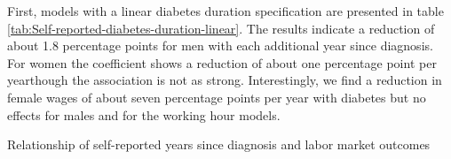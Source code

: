 \documentclass[12pt,english,british]{article}
\providecommand{\DIFaddtex}[1]{{\protect\color{blue}\uwave{#1}}} %
\providecommand{\DIFaddbegin}{} %
\providecommand{\DIFaddend}{} %
\providecommand{\DIFadd}[1]{\texorpdfstring{\DIFaddtex{#1}}{#1}} %
\begin{document}
First, models with a linear diabetes duration specification are presented
in table \ref{tab:Self-reported-diabetes-duration-linear}. The results
indicate a reduction of about 1.8 percentage points for men with each
additional year since diagnosis. For women the coefficient shows a
reduction of about one percentage point per year\DIFaddbegin \DIFadd{, }\DIFaddend though the association
is not as strong. Interestingly, we find a reduction in female wages of about seven percentage points per year with diabetes but no effects for males and for the working hour models.
\begin{table}[h]
\caption{\label{tab:Self-reported-diabetes-duration-linear}Relationship of self-reported years since diagnosis and labor market outcomes}
\begin{center}
\begin{adjustbox}{max width=\textwidth}


\end{adjustbox}
\end{center}
\end{table}
\end{document}
